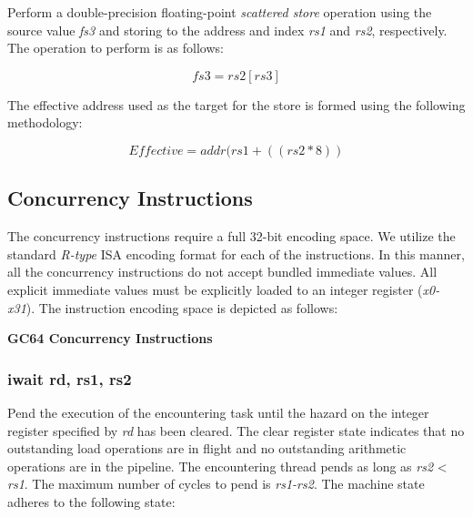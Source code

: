 \documentclass{article}
\begin{document}
Perform a double-precision floating-point \emph{scattered store} operation 
using the source value \emph{fs3} and storing to the address and index
\emph{rs1} and \emph{rs2}, respectively.  The operation to
perform is as follows: 

\begin{equation}
fs3 = rs2[rs3]
\end{equation}

The effective address used as the target
for the store is formed using the following methodology:

\begin{equation}
Effective = addr(rs1 + ((rs2 * 8))
\end{equation}


\subsection{Concurrency Instructions}

The concurrency instructions require a full 32-bit encoding space.  
We utilize the standard \emph{R-type} ISA encoding format for each 
of the instructions.  In this manner, all the concurrency instructions
do not accept bundled immediate values.  All explicit immediate values
must be explicitly loaded to an integer register (\emph{x0-x31}).  The 
instruction encoding space is depicted as follows: 

\begin{center}
\textbf{GC64 Concurrency Instructions}
\makebox[0.03in][s]{}\makebox[0.03in][s]{}\makebox[0.03in][s]{}\makebox[0.03in][s]{}\makebox[0.03in][s]{}
\end{center}

\subsubsection{iwait rd, rs1, rs2}

Pend the execution of the encountering task until the hazard
on the integer register specified by \emph{rd} has been cleared. 
The clear register state indicates that no outstanding load 
operations are in flight and no outstanding arithmetic 
operations are in the pipeline.  The encountering thread
pends as long as \emph{rs2} < \emph{rs1}.  The maximum number of cycles to
pend is \emph{rs1-rs2}.  The machine state adheres to the following state: 
\end{document}
